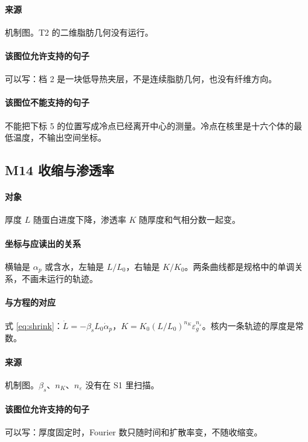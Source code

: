 \paragraph{来源}
机制图。T2 的二维脂肪几何没有运行。

\paragraph{该图位允许支持的句子}
可以写：档 2 是一块低导热夹层，不是连续脂肪几何，也没有纤维方向。

\paragraph{该图位不能支持的句子}
不能把下标 5 的位置写成冷点已经离开中心的测量。冷点在核里是十六个体的最低温度，不输出空间坐标。

\subsection{M14 收缩与渗透率}
\paragraph{对象}
厚度 $L$ 随蛋白进度下降，渗透率 $K$ 随厚度和气相分数一起变。

\paragraph{坐标与应读出的关系}
横轴是 $\alpha_p$ 或含水，左轴是 $L/L_0$，右轴是 $K/K_0$。两条曲线都是规格中的单调关系，不画未运行的轨迹。

\paragraph{与方程的对应}
式 \eqref{eq:shrink}：$\dot L=-\beta_s L_0\dot\alpha_p$，$K=K_0(L/L_0)^{n_K}\varepsilon_g^{n_\varepsilon}$。核内一条轨迹的厚度是常数。

\paragraph{来源}
机制图。$\beta_s$、$n_K$、$n_\varepsilon$ 没有在 S1 里扫描。

\paragraph{该图位允许支持的句子}
可以写：厚度固定时，Fourier 数只随时间和扩散率变，不随收缩变。

